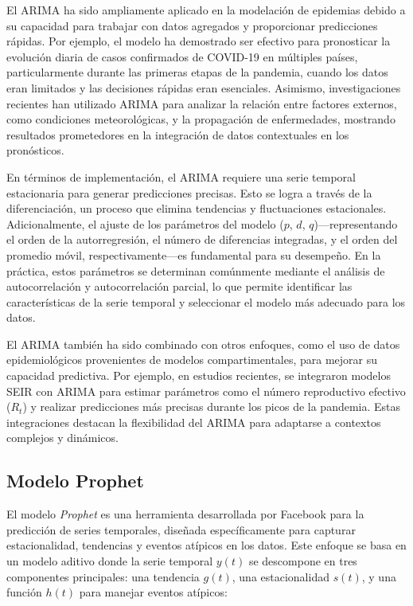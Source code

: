 El ARIMA ha sido ampliamente aplicado en la modelación de epidemias debido a su capacidad para trabajar con datos agregados y proporcionar predicciones rápidas. Por ejemplo, el modelo ha demostrado ser efectivo para pronosticar la evolución diaria de casos confirmados de COVID-19 en múltiples países, particularmente durante las primeras etapas de la pandemia, cuando los datos eran limitados y las decisiones rápidas eran esenciales\parencite{Chowell2016EarlyGrowth, Baccega2024Sybil}. Asimismo, investigaciones recientes han utilizado ARIMA para analizar la relación entre factores externos, como condiciones meteorológicas, y la propagación de enfermedades, mostrando resultados prometedores en la integración de datos contextuales en los pronósticos\parencite{Baccega2024Sybil}.

En términos de implementación, el ARIMA requiere una serie temporal estacionaria para generar predicciones precisas. Esto se logra a través de la diferenciación, un proceso que elimina tendencias y fluctuaciones estacionales. Adicionalmente, el ajuste de los parámetros del modelo (\(p\), \(d\), \(q\))—representando el orden de la autorregresión, el número de diferencias integradas, y el orden del promedio móvil, respectivamente—es fundamental para su desempeño. En la práctica, estos parámetros se determinan comúnmente mediante el análisis de autocorrelación y autocorrelación parcial, lo que permite identificar las características de la serie temporal y seleccionar el modelo más adecuado para los datos\parencite{Saleem2022MLDLModels, Santangelo2023MachineLearning}.

El ARIMA también ha sido combinado con otros enfoques, como el uso de datos epidemiológicos provenientes de modelos compartimentales, para mejorar su capacidad predictiva. Por ejemplo, en estudios recientes, se integraron modelos SEIR con ARIMA para estimar parámetros como el número reproductivo efectivo (\(R_t\)) y realizar predicciones más precisas durante los picos de la pandemia\parencite{Baccega2024Sybil, Rodriguez2022DataCentric}. Estas integraciones destacan la flexibilidad del ARIMA para adaptarse a contextos complejos y dinámicos.

\subsection{Modelo Prophet}\label{section:prophet-model}

El modelo \textit{Prophet} es una herramienta desarrollada por Facebook para la predicción de series temporales, diseñada específicamente para capturar estacionalidad, tendencias y eventos atípicos en los datos. Este enfoque se basa en un modelo aditivo donde la serie temporal \( y(t) \) se descompone en tres componentes principales: una tendencia \( g(t) \), una estacionalidad \( s(t) \), y una función \( h(t) \) para manejar eventos atípicos:

